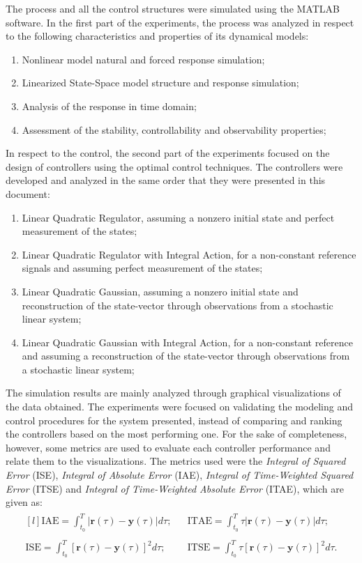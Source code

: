 \documentclass[a4paper,11pt]{book}
\numberwithin{figure}{chapter}
\numberwithin{equation}{chapter}
\numberwithin{table}{chapter}
\theoremstyle{definition}
\begin{document}
The process and all the control structures were simulated using the MATLAB software. In the first part of the experiments, the process was analyzed in respect to the following characteristics and properties of its dynamical models:
\begin{enumerate}
	\item Nonlinear model natural and forced response simulation;
	\item Linearized State-Space model structure and response simulation;
	\item Analysis of the response in time domain;
	\item Assessment of the stability, controllability and observability properties;
\end{enumerate}

In respect to the control, the second part of the experiments focused on the design of controllers using the optimal control techniques. The controllers were developed and analyzed in the same order that they were presented in this document:
\begin{enumerate}
	\item Linear Quadratic Regulator, assuming a nonzero initial state and perfect measurement of the states;
	\item Linear Quadratic Regulator with Integral Action, for a non-constant reference signals and assuming perfect measurement of the states;
	\item Linear Quadratic Gaussian, assuming a nonzero initial state and reconstruction of the state-vector through observations from a stochastic linear system;
	\item Linear Quadratic Gaussian with Integral Action, for a non-constant reference and assuming a reconstruction of the state-vector through observations from a stochastic linear system;
\end{enumerate}

The simulation results are mainly analyzed through graphical visualizations of the data obtained. The experiments were focused on validating the modeling and control procedures for the system presented, instead of comparing and ranking the controllers based on the most performing one. For the sake of completeness, however, some metrics are used to evaluate each controller performance and relate them to the visualizations. The metrics used were the \textit{Integral of Squared Error} (ISE), \textit{Integral of Absolute Error} (IAE), \textit{Integral of Time-Weighted Squared Error} (ITSE) and \textit{Integral of Time-Weighted Absolute Error} (ITAE), which are given as:
\begin{align}
\begin{matrix*}[l] \displaystyle
	\text{IAE} = \displaystyle\int_{t_0}^{T} | \bm{r}(\tau) - \bm{y}(\tau) | d\tau; & & \text{ITAE} = \displaystyle\int_{t_0}^{T} \tau | \bm{r}(\tau) - \bm{y}(\tau) | d\tau;\\ \\
	\text{ISE} = \displaystyle\int_{t_0}^{T} \left[ \bm{r}(\tau) - \bm{y}(\tau) \right]^2 d\tau; & & \text{ITSE} = \displaystyle\int_{t_0}^{T} \tau \left[ \bm{r}(\tau) - \bm{y}(\tau) \right]^2 d\tau.
\end{matrix*}
\end{align}
\end{document}
